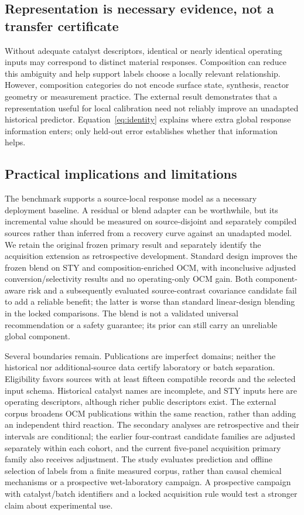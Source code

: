 \documentclass[11pt]{article}
\begin{document}
\subsection{Representation is necessary evidence, not a transfer certificate}
Without adequate catalyst descriptors, identical or nearly identical operating inputs may correspond to distinct material responses. Composition can reduce this ambiguity and help support labels choose a locally relevant relationship. However, composition categories do not encode surface state, synthesis, reactor geometry or measurement practice. The external result demonstrates that a representation useful for local calibration need not reliably improve an unadapted historical predictor. Equation~\ref{eq:identity} explains where extra global response information enters; only held-out error establishes whether that information helps.

\subsection{Practical implications and limitations}
The benchmark supports a source-local response model as a necessary deployment baseline. A residual or blend adapter can be worthwhile, but its incremental value should be measured on source-disjoint and separately compiled sources rather than inferred from a recovery curve against an unadapted model. We retain the original frozen primary result and separately identify the acquisition extension as retrospective development. Standard design improves the frozen blend on STY and composition-enriched OCM, with inconclusive adjusted conversion/selectivity results and no operating-only OCM gain. Both component-aware risk and a subsequently evaluated source-contrast covariance candidate fail to add a reliable benefit; the latter is worse than standard linear-design blending in the locked comparisons. The blend is not a validated universal recommendation or a safety guarantee; its prior can still carry an unreliable global component.

Several boundaries remain. Publications are imperfect domains; neither the historical nor additional-source data certify laboratory or batch separation. Eligibility favors sources with at least fifteen compatible records and the selected input schema. Historical catalyst names are incomplete, and STY inputs here are operating descriptors, although richer public descriptors exist. The external corpus broadens OCM publications within the same reaction, rather than adding an independent third reaction. The secondary analyses are retrospective and their intervals are conditional; the earlier four-contrast candidate families are adjusted separately within each cohort, and the current five-panel acquisition primary family also receives adjustment. The study evaluates prediction and offline selection of labels from a finite measured corpus, rather than causal chemical mechanisms or a prospective wet-laboratory campaign. A prospective campaign with catalyst/batch identifiers and a locked acquisition rule would test a stronger claim about experimental use.
\end{document}

